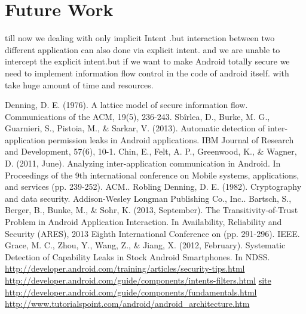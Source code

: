 \documentclass[11pt]{report}
\begin{document}
\section{Future Work}
till now we dealing with only implicit Intent .but interaction between two different application can also done via explicit intent. 
and we are unable to intercept the explicit intent.but if we want to make Android totally secure we need to implement information flow control in the code of android itself.
with take huge amount of time and resources.

\begin{thebibliography}{100} %
\addtolength{\leftmargin}{0.2in} %
\setlength{\itemindent}{-0.2in}
  Denning, D. E. (1976). A lattice model of secure information flow. Communications of the ACM, 19(5), 236-243. 
 Sbîrlea, D., Burke, M. G., Guarnieri, S., Pistoia, M., \& Sarkar, V. (2013). Automatic detection of inter-application permission leaks in Android applications. IBM Journal of Research and Development, 57(6), 10-1.
Chin, E., Felt, A. P., Greenwood, K., \& Wagner, D. (2011, June). Analyzing inter-application communication in Android. In Proceedings of the 9th international conference on Mobile systems, applications, and services (pp. 239-252). ACM..
Robling Denning, D. E. (1982). Cryptography and data security. Addison-Wesley Longman Publishing Co., Inc..
 Bartsch, S., Berger, B., Bunke, M., \& Sohr, K. (2013, September). The Transitivity-of-Trust Problem in Android Application Interaction. In Availability, Reliability and Security (ARES), 2013 Eighth International Conference on (pp. 291-296). IEEE.
 Grace, M. C., Zhou, Y., Wang, Z., \& Jiang, X. (2012, February). Systematic Detection of Capability Leaks in Stock Android Smartphones. In NDSS.
 \url{http://developer.android.com/training/articles/security-tips.html}
 \url{http://developer.android.com/guide/components/intents-filters.html}
\url{site http://developer.android.com/guide/components/fundamentals.html}
\url{http://www.tutorialspoint.com/android/android_architecture.htm}

\end{thebibliography}
\end{document}
